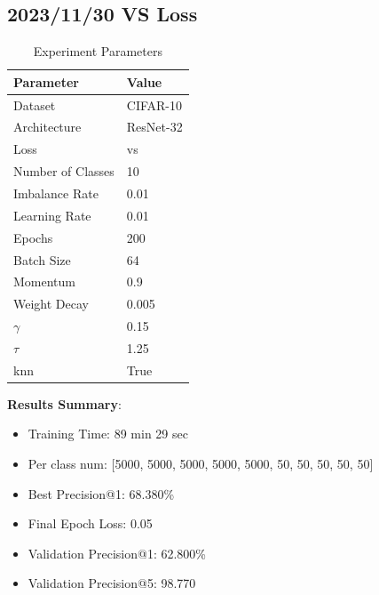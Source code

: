 \documentclass{article}
\begin{document}
\begin{multicols}{2} %
\section{2023/11/30 VS Loss }
\begin{table}[H]
\centering
\caption{Experiment Parameters}
\label{tab:parameters}
\begin{tabular}{ll}
\toprule
Parameter & Value \\
\midrule
Dataset & CIFAR-10 \\
Architecture & ResNet-32 \\
Loss & vs \\
Number of Classes & 10 \\
Imbalance Rate & 0.01 \\
Learning Rate & 0.01 \\
Epochs & 200 \\
Batch Size & 64 \\
Momentum & 0.9 \\
Weight Decay & 0.005 \\
$\gamma$ & 0.15\\
$\tau$ & 1.25\\
knn & True \\
\bottomrule
\end{tabular}
\end{table}

\textbf{Results Summary}:
\begin{itemize}
    \item Training Time: 89 min 29 sec
    \item Per class num: [5000, 5000, 5000, 5000, 5000, 50, 50, 50, 50, 50]
    \item Best Precision@1: 68.380\%  
    \item Final Epoch Loss: 0.05 
    \item Validation Precision@1: 62.800\%
    \item Validation Precision@5: 98.770%
\end{itemize}


\end{multicols}
\end{document}
